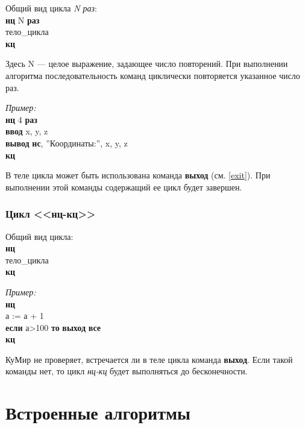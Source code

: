 Общий вид цикла \emph{N раз}:\\
{\sffamily
\textbf{нц} N \textbf{раз}\\
\otstup тело\_цикла\\
\textbf{кц}
}

Здесь N --- целое выражение, задающее число повторений. При выполнении алгоритма последовательность команд циклически повторяется указанное число раз.

\emph{Пример:}\\
{\sffamily
\textbf{нц} 4 \textbf{раз}\\
\otstup \textbf{ввод} x, y, z\\
\otstup \textbf{вывод} \textbf{нс}, ''Координаты:'', x, y, z\\
\textbf{кц}
}

В теле цикла может быть использована команда \textbf{выход} (см. \ref{exit}). При выполнении этой команды содержащий ее цикл будет завершен.

\subsubsection[Цикл ''нц-кц'']{Цикл <<нц-кц>>}

Общий вид цикла:\\
{\sffamily
\textbf{нц}\\
\otstup тело\_цикла\\
\textbf{кц}
}

\emph{Пример:}\\
{\sffamily
\textbf{нц}\\
\otstup а := а + 1\\
\otstup \textbf{если} а>100 \textbf{то} \textbf{выход} \textbf{все}\\
\textbf{кц}
}

КуМир не проверяет, встречается ли в теле цикла команда \textbf{выход}. Если такой команды нет, то цикл \emph{нц-кц} будет выполняться до бесконечности.

















\section{Встроенные алгоритмы}

